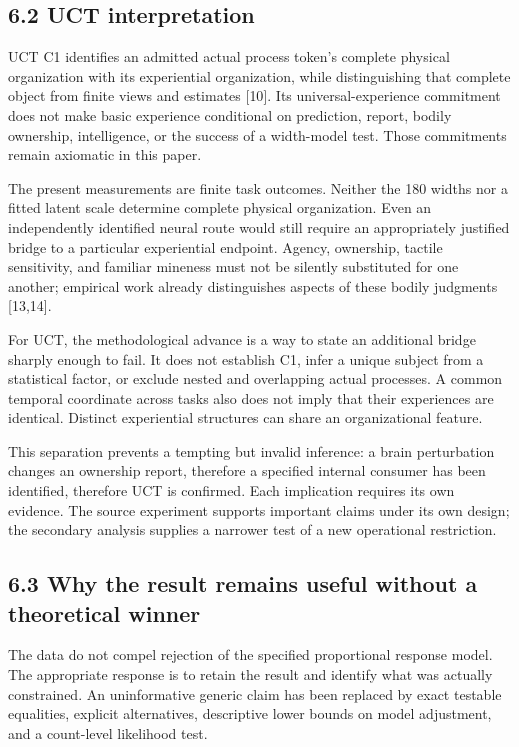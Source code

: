 \documentclass[
  11pt,
]{article}
\let\ctdoldsubsection\subsection
\renewcommand{\subsection}{\Needspace{6\baselineskip}\ctdoldsubsection}
\begin{document}
\hypertarget{uct-interpretation}{%
\subsection{6.2 UCT interpretation}\label{uct-interpretation}}

UCT C1 identifies an admitted actual process token's complete physical
organization with its experiential organization, while distinguishing
that complete object from finite views and estimates {[}10{]}. Its
universal-experience commitment does not make basic experience
conditional on prediction, report, bodily ownership, intelligence, or
the success of a width-model test. Those commitments remain axiomatic in
this paper.

The present measurements are finite task outcomes. Neither the 180
widths nor a fitted latent scale determine complete physical
organization. Even an independently identified neural route would still
require an appropriately justified bridge to a particular experiential
endpoint. Agency, ownership, tactile sensitivity, and familiar mineness
must not be silently substituted for one another; empirical work already
distinguishes aspects of these bodily judgments {[}13,14{]}.

For UCT, the methodological advance is a way to state an additional
bridge sharply enough to fail. It does not establish C1, infer a unique
subject from a statistical factor, or exclude nested and overlapping
actual processes. A common temporal coordinate across tasks also does
not imply that their experiences are identical. Distinct experiential
structures can share an organizational feature.

This separation prevents a tempting but invalid inference: a brain
perturbation changes an ownership report, therefore a specified internal
consumer has been identified, therefore UCT is confirmed. Each
implication requires its own evidence. The source experiment supports
important claims under its own design; the secondary analysis supplies a
narrower test of a new operational restriction.

\hypertarget{why-the-result-remains-useful-without-a-theoretical-winner}{%
\subsection{6.3 Why the result remains useful without a theoretical
winner}\label{why-the-result-remains-useful-without-a-theoretical-winner}}

The data do not compel rejection of the specified proportional response
model. The appropriate response is to retain the result and identify
what was actually constrained. An uninformative generic claim has been
replaced by exact testable equalities, explicit alternatives,
descriptive lower bounds on model adjustment, and a count-level
likelihood test.
\end{document}

